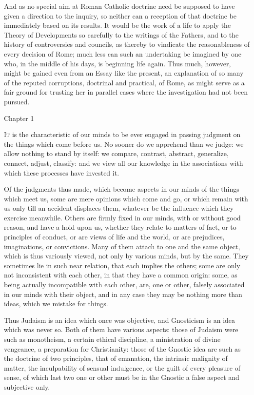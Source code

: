 And as no special aim at Roman Catholic doctrine need
be supposed to have given a direction to the inquiry, so
neither can a reception of that doctrine be immediately
based on its results. It would be the work of a life to
apply the Theory of Developments so carefully to the
writings of the Fathers, and to the history of
controversies and councils, as thereby to vindicate the
reasonableness of every decision of Rome; much less can
such an undertaking be imagined by one who, in the middle
of his days, is beginning life again. Thus much, however,
might be gained even from an Essay like the present, an
explanation of so many of the reputed corruptions,
doctrinal and practical, of Rome, as might serve as a
fair ground for trusting her in parallel cases where the
investigation had not been pursued.

Chapter 1



I\textsc{t} is the characteristic of our minds to be ever
engaged in passing judgment on the things which come
before us. No sooner do we apprehend than we judge: we
allow nothing to stand by itself: we compare, contrast,
abstract, generalize, connect, adjust, classify: and we
view all our knowledge in the associations with which
these processes have invested it.

Of the judgments thus made, which become aspects in
our minds of the things which meet us, some are mere
opinions which come and go, or which remain with us only
till an accident displaces them, whatever be the
influence which they exercise meanwhile. Others are
firmly fixed in our minds, with or without good reason,
and have a hold upon us, whether they relate to matters
of fact, or to principles of conduct, or are views of
life and the world, or are prejudices, imaginations, or
convictions. Many of them attach to one and the same
object, which is thus variously viewed, not only by
various minds, but by the same. They sometimes lie in
such near relation, that each implies the others; some
are only not inconsistent with each other, in that they
have a common origin: some, as being actually
incompatible with each other, are, one or other, falsely
associated in our minds with their object, and in any
case they may be nothing more than ideas, which we
mistake for things.

Thus Judaism is an idea which once was objective, and
Gnosticism is an idea which was never so. Both of them
have various aspects: those of Judaism were such as
monotheism, a certain ethical discipline, a ministration
of divine vengeance, a preparation for Christianity:
those of the Gnostic idea are such as the doctrine of two
principles, that of emanation, the intrinsic malignity of
matter, the inculpability of sensual indulgence, or the
guilt of every pleasure of sense, of which last two one
or other must be in the Gnostic a false aspect and
subjective only.


